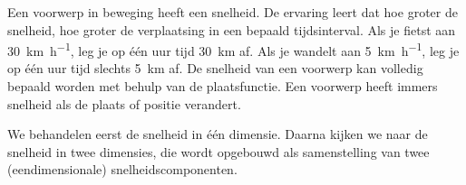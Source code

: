 \documentclass{ximera}
\begin{document}
	\author{Bart Lambregs,Vincent Gellens}
    \xmsource\xmuitleg





Een voorwerp in beweging heeft een snelheid. 
De ervaring leert dat hoe groter de snelheid, hoe groter de verplaatsing in een bepaald tijdsinterval. 
Als je fietst aan \SI{30}{\kilo\meter\per\hour}, leg je op één uur tijd \SI{30}{km} af. 
Als je wandelt aan \SI{5}{\kilo\meter\per\hour}, leg je op één uur tijd slechts \SI{5}{km} af. 
De snelheid van een voorwerp kan volledig bepaald worden met behulp van de plaatsfunctie.
Een voorwerp heeft immers snelheid als de plaats of positie verandert. 

We behandelen eerst de snelheid in één dimensie. 
Daarna kijken we naar de snelheid in twee dimensies, die wordt opgebouwd als samenstelling van twee (eendimensionale) snelheidscomponenten. 


\end{document}
